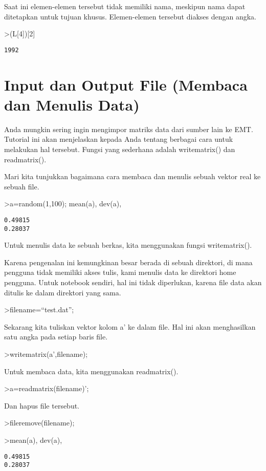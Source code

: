 \documentclass[
]{book}
\begin{document}
Saat ini elemen-elemen tersebut tidak memiliki nama, meskipun nama dapat ditetapkan untuk tujuan khusus. Elemen-elemen tersebut diakses dengan angka.

\textgreater(L{[}4{]}){[}2{]}

\begin{verbatim}
1992
\end{verbatim}

\chapter{Input dan Output File (Membaca dan Menulis Data)}\label{input-dan-output-file-membaca-dan-menulis-data}

Anda mungkin sering ingin mengimpor matriks data dari sumber lain ke EMT. Tutorial ini akan menjelaskan kepada Anda tentang berbagai cara untuk melakukan hal tersebut. Fungsi yang sederhana adalah writematrix() dan readmatrix().

Mari kita tunjukkan bagaimana cara membaca dan menulis sebuah vektor real ke sebuah file.

\textgreater a=random(1,100); mean(a), dev(a),

\begin{verbatim}
0.49815
0.28037
\end{verbatim}

Untuk menulis data ke sebuah berkas, kita menggunakan fungsi writematrix().

Karena pengenalan ini kemungkinan besar berada di sebuah direktori, di mana pengguna tidak memiliki akses tulis, kami menulis data ke direktori home pengguna. Untuk notebook sendiri, hal ini tidak diperlukan, karena file data akan ditulis ke dalam direktori yang sama.

\textgreater filename=``test.dat'';

Sekarang kita tuliskan vektor kolom a' ke dalam file. Hal ini akan menghasilkan satu angka pada setiap baris file.

\textgreater writematrix(a',filename);

Untuk membaca data, kita menggunakan readmatrix().

\textgreater a=readmatrix(filename)';

Dan hapus file tersebut.

\textgreater fileremove(filename);

\textgreater mean(a), dev(a),

\begin{verbatim}
0.49815
0.28037
\end{verbatim}
\end{document}
